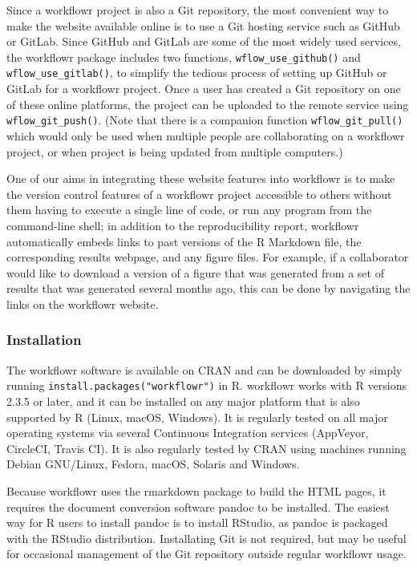\documentclass[9pt,a4paper]{extarticle}
\begin{document}
Since a workflowr project is also a Git repository, the most convenient
way to make the website available online is to use a Git hosting service
such as GitHub or GitLab. Since GitHub and GitLab are some of the most
widely used services, the workflowr package includes two functions,
\verb|wflow_use_github()| and \verb|wflow_use_gitlab()|, to simplify the tedious
process of setting up GitHub or GitLab for a workflowr project. Once a
user has created a Git repository on one of these online platforms, the
project can be uploaded to the remote service using \verb|wflow_git_push()|.
(Note that there is a companion function \verb|wflow_git_pull()| which would
only be used when multiple people are collaborating on a workflowr
project, or when project is being updated from multiple computers.)

One of our aims in integrating these website features into workflowr is
to make the version control features of a workflowr project accessible
to others without them having to execute a single line of code, or run
any program from the command-line shell; in addition to the
reproducibility report, workflowr automatically embeds links to past
versions of the R Markdown file, the corresponding results webpage, and
any figure files. For example, if a collaborator would like to download
a version of a figure that was generated from a set of results that was
generated several months ago, this can be done by navigating the links
on the workflowr website.

\subsubsection*{Installation}

The workflowr software is available on CRAN and can be downloaded by
simply running \verb|install.packages("workflowr")| in R. workflowr
works with R versions 2.3.5 or later, and it can be installed on any
major platform that is also supported by R (Linux, macOS, Windows). It
is regularly tested on all major operating systems via several
Continuous Integration services (AppVeyor, CircleCI, Travis CI). It is
also regularly tested by CRAN using machines running Debian GNU/Linux,
Fedora, macOS, Solaris and Windows.

Because workflowr uses the rmarkdown package to build the HTML pages, it
requires the document conversion software pandoc to be installed. The
easiest way for R users to install pandoc is to install RStudio, as
pandoc is packaged with the RStudio distribution. Installating Git is
not required, but may be useful for occasional management of the Git
repository outside regular workflowr usage.
\end{document}
